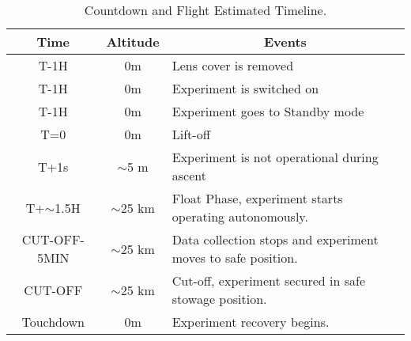 \begin{table}
\centering


\begin{tabular}{|l|l|l|}
\hline
\multicolumn{1}{|c|}{\textbf{Time}}       & \multicolumn{1}{c|}{\textbf{Altitude}}      & \multicolumn{1}{c|}{\textbf{Events}}                              \\ \hline
\multicolumn{1}{|c|}{T-1H}    & \multicolumn{1}{c|}{0m}             & Lens cover is removed                     \\ \hline           
\multicolumn{1}{|c|}{T-1H}    & \multicolumn{1}{c|}{0m}             & Experiment is switched on                                \\ \hline
\multicolumn{1}{|c|}{T-1H}    & \multicolumn{1}{c|}{0m}             & Experiment goes to Standby mode                          \\ \hline
\multicolumn{1}{|c|}{T=0}        & \multicolumn{1}{c|}{0m}             & Lift-off                                              \\ \hline
\multicolumn{1}{|c|}{T+1s}       & \multicolumn{1}{c|}{$\sim$5 m} & Experiment is not operational during ascent                  \\ \hline
\multicolumn{1}{|c|}{T+$\sim$1.5H}                     & \multicolumn{1}{c|}{$\sim$25 km}                        & Float Phase, experiment starts operating autonomously.                                           \\ \hline
\multicolumn{1}{|c|}{CUT-OFF-5MIN}                     & \multicolumn{1}{c|}{$\sim$25 km}                        & Data collection stops and experiment moves to safe position.                                                \\ \hline
\multicolumn{1}{|c|}{CUT-OFF}                     & \multicolumn{1}{c|}{$\sim$25 km}                        & Cut-off, experiment secured in safe stowage position.                                                 \\ \hline
\multicolumn{1}{|c|}{Touchdown}                     &  \multicolumn{1}{c|}{0m}                        &  Experiment recovery begins.                \\ \hline
\end{tabular}
\caption{Countdown and Flight Estimated Timeline.}
\label{tab:countflight}
\end{table}
\raggedbottom
